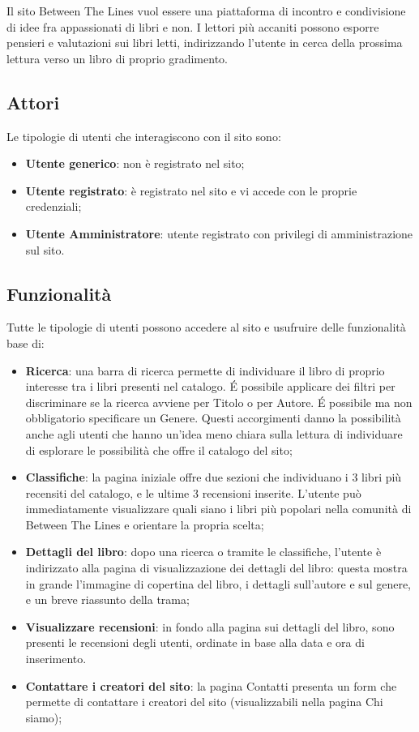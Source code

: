 \documentclass[12pt,a4paper,headings=optiontohead]{article}
\begin{document}
	Il sito Between The Lines vuol essere una piattaforma di incontro e condivisione di idee fra appassionati di libri e non. I lettori più accaniti possono esporre pensieri e valutazioni sui libri letti, indirizzando l'utente in cerca della prossima lettura verso un libro di proprio gradimento.
	
	
	\subsection{Attori}
	
	Le tipologie di utenti che interagiscono con il sito sono:
	\begin{itemize}
		\item \textbf{Utente generico}: non è registrato nel sito;
		\item \textbf{Utente registrato}: è registrato nel sito e vi accede con le proprie credenziali;
		\item \textbf{Utente Amministratore}: utente registrato con privilegi di amministrazione sul sito.	
	\end{itemize} 
	
	
	\subsection{Funzionalità}
	
	Tutte le tipologie di utenti possono accedere al sito e usufruire delle funzionalità base di:
	\begin{itemize}
		\item \textbf{Ricerca}: una barra di ricerca permette di individuare il libro di proprio interesse tra i libri presenti nel catalogo. \'E possibile applicare dei filtri per discriminare se la ricerca avviene per Titolo o per Autore. \'E possibile ma non obbligatorio specificare un Genere. Questi accorgimenti danno la possibilità anche agli utenti che hanno un'idea meno chiara sulla lettura di individuare di esplorare le possibilità che offre il catalogo del sito;
		\item \textbf{Classifiche}: la pagina iniziale offre due sezioni che individuano i 3 libri più recensiti del catalogo, e le ultime 3 recensioni inserite. L'utente può immediatamente visualizzare quali siano i libri più popolari nella comunità di Between The Lines e orientare la propria scelta;
		\item \textbf{Dettagli del libro}: dopo una ricerca o tramite le classifiche, l'utente è indirizzato alla pagina di visualizzazione dei dettagli del libro: questa mostra in grande l'immagine di copertina del libro, i dettagli sull'autore e sul genere, e un breve riassunto della trama;
		\item \textbf{Visualizzare recensioni}: in fondo alla pagina sui dettagli del libro, sono presenti le recensioni degli utenti, ordinate in base alla data e ora di inserimento.
		\item \textbf{Contattare i creatori del sito}: la pagina Contatti presenta un form che permette di contattare i creatori del sito (visualizzabili nella pagina Chi siamo);
	\end{itemize}
\end{document}
